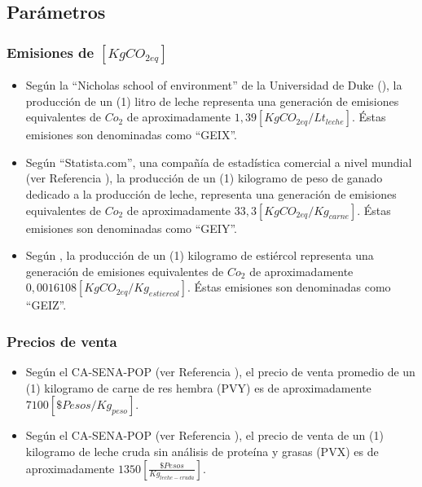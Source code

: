 \subsection{Parámetros}

\subsubsection{Emisiones de $[KgCO_{2eq}]$}

\begin{itemize}
    \item Según la ``Nicholas school of environment'' de la Universidad de Duke (\cite{ecoduke}), la producción de un (1) litro de leche representa una generación de  emisiones equivalentes de $Co_{2}$ de aproximadamente $1,39[KgCO_{2eq}/Lt_{leche}]$. Éstas emisiones son denominadas como ``GEIX''.
    \item Según ``Statista.com'', una compañía de estadística comercial a nivel mundial (ver Referencia \cite{statista}), la producción de un (1) kilogramo de peso de ganado dedicado a la producción de leche, representa una generación de  emisiones equivalentes de $Co_{2}$ de aproximadamente $33,3[KgCO_{2eq}/Kg_{carne}]$. Éstas emisiones son denominadas como ``GEIY''.
    \item Según \cite{manure}, la producción de un (1) kilogramo de estiércol representa una generación de  emisiones equivalentes de $Co_{2}$ de aproximadamente $0,0016108[KgCO_{2eq}/Kg_{estiercol}]$. Éstas emisiones son denominadas como ``GEIZ''.
\end{itemize}


\subsubsection{Precios de venta}

\begin{itemize}
    \item Según el CA-SENA-POP (ver Referencia \cite{casena}), el precio  de venta promedio de un (1) kilogramo de carne de res hembra (PVY) es de aproximadamente $7100[\$Pesos/Kg_{peso}]$.
    \item Según el CA-SENA-POP (ver Referencia \cite{casena}), el precio de venta de un (1) kilogramo de leche cruda sin análisis de proteína y grasas (PVX) es de aproximadamente $1350[\frac{\$Pesos}{Kg_{leche-cruda}}]$.
\end{itemize}

